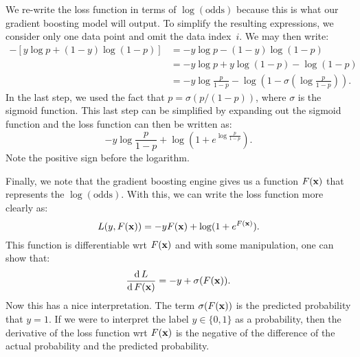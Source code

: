 We re-write the loss function in terms of $\log (\text{odds})$ because this 
is what our gradient boosting model will output. To simplify the resulting 
expressions, we consider only one data point and omit the data index~$i$. 
We may then write:
\begin{align*}
    - \left [ y \log p + (1 - y) \log (1 - p) \right ] 
        & = - y \log p - (1 - y) \log (1 - p) \\
        & = - y \log p + y \log (1 - p) - \log (1 - p) \\
        & = - y \log \frac{p}{1 - p} - 
                \log \left (1 - \sigma \left ( \log \frac{p}{1 - p} \right ) \right ).
\end{align*}
In the last step, we used the fact that $p = \sigma (p / (1 - p))$, where $\sigma$
is the sigmoid function. This last step can be simplified by expanding out the 
sigmoid function and the loss function can then be written as:
\[
    - y \log \frac{p}{1 - p} + \log (1 + e^{\log \frac{p}{1 - p}}).
\]
Note the positive sign before the logarithm. 

Finally, we note that the gradient 
boosting engine gives us a function $F(\mathbf{x})$ that represents the 
$\log (\text{odds})$. With this, we can write the loss function more clearly as:
\[
    L(y, F(\mathbf{x})) = -y F(\mathbf{x}) + \log (1 + e^{F(\mathbf{x})}).
\]
This function is differentiable wrt $F(\mathbf{x})$ and with some manipulation, 
one can show that:
\[
    \frac{\operatorname{d} L}{\operatorname{d} F(\mathbf{x})} = - y + \sigma (F(\mathbf{x})). 
\]
Now this has a nice interpretation. The term $\sigma (F(\mathbf{x}))$ is the 
predicted probability that $y = 1$. If we were to interpret the label 
$y \in \{0, 1\}$ as a probability, then the derivative of the loss function 
wrt $F(\mathbf{x})$ is the negative of the difference of the actual probability 
and the predicted probability. 

